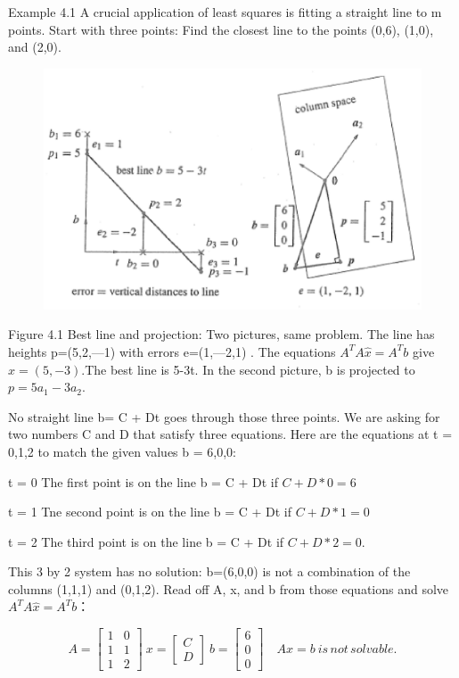 Example 4.1 A crucial application of least squares is fitting a straight line to m points.
Start with three points: Find the closest line to the points (0,6), (1,0), and (2,0). 

\begin{figure}[h]
	\centering
	\includegraphics[width=0.7\linewidth]{TeX_files/Part02/chapter04/image/4-1}
	\caption{}
	\label{fig:4-1}
\end{figure}

Figure 4.1  Best line and projection: Two pictures, same problem. The line has heights p=(5,2,—1) with errors e=(1,—2,1) . The equations $A^TA\hat{x}=A^Tb$ give $\hat{x}=(5,-3)$.The best line is 5-3t. In the second picture, b is projected to $p=5a_1-3a_2$.

No straight line b= C + Dt goes through those three points. We are asking for two
numbers C and D that satisfy three equations. Here are the equations at t = 0,1,2 to
match the given values b = 6,0,0:

t = 0 The first point is on the line b = C + Dt  \quad\quad if\;  $C+D*0=6$ 

t = 1 Tne second point is on the line b = C + Dt \quad if\;  $C+D*1=0$

t = 2 The third point is on the line b = C + Dt  \quad\quad if\;  $C+D*2=0$.

This 3 by 2 system has no solution: b=(6,0,0) is not a combination of the columns
(1,1,1) and (0,1,2). Read off A, x, and b from those equations and solve $A^TA\hat{x}=A^Tb$：

\begin{equation*}
A=              
\begin{bmatrix}
1 & 0 \\ 1 & 1 \\ 1 & 2
\end{bmatrix}
\ x=
\begin{bmatrix}
C \\ D
\end{bmatrix}
\ b=
\begin{bmatrix}
6 \\ 0 \\0
\end{bmatrix}
\quad Ax=b \:is \,not \,solvable.	
\end{equation*}

